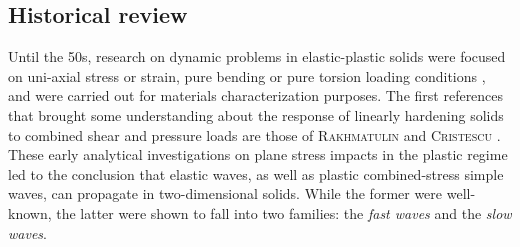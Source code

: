 \subsection{Historical review}
\label{sec:historical-review}


Until the 50s, research on dynamic problems in elastic-plastic solids were focused on uni-axial stress or strain, pure bending or pure torsion loading conditions \cite{Taylor,vonKarman}, and were carried out for materials characterization purposes.
The first references that brought some understanding about the response of linearly hardening solids to combined shear and pressure loads are those of \textsc{Rakhmatulin} \cite{Rakhmatulin} and \textsc{Cristescu} \cite{CRISTESCU19591605}.
These early analytical investigations on plane stress impacts in the plastic regime led to the conclusion that elastic waves, as well as plastic combined-stress simple waves, can propagate in two-dimensional solids. 
While the former were well-known, the latter were shown to fall into two families: the \textit{fast waves} and the \textit{slow waves}.


